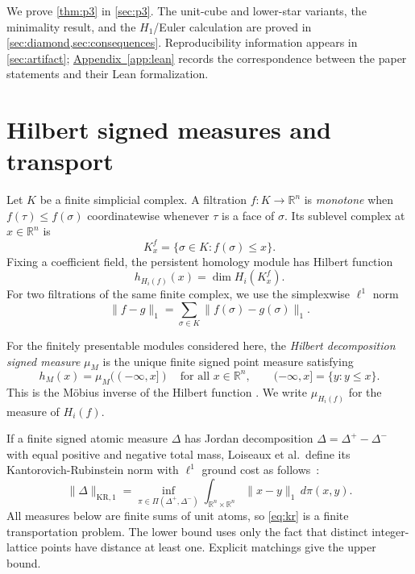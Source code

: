 \documentclass[11pt]{article}
\theoremstyle{definition}
\newcommand{\R}{\mathbb{R}}
\newcommand{\1}{\mathbf{1}}
\newcommand{\KR}{\mathrm{KR}}
\begin{document}
We prove \cref{thm:p3} in \cref{sec:p3}.  The unit-cube and lower-star
variants, the minimality result, and the $H_1$/Euler calculation are proved in
\cref{sec:diamond,sec:consequences}.  Reproducibility information appears in
\cref{sec:artifact};
\hyperref[app:lean]{Appendix~\ref*{app:lean}} records the correspondence
between the paper statements and their Lean formalization.

\section{Hilbert signed measures and transport}\label{sec:background}

Let $K$ be a finite simplicial complex.  A filtration
$f:K\to\R^n$ is \emph{monotone} when
$f(\tau)\leq f(\sigma)$ coordinatewise whenever $\tau$ is a face of
$\sigma$.  Its sublevel complex at $x\in\R^n$ is
\[
  K^f_x=\{\sigma\in K:f(\sigma)\leq x\}.
\]
Fixing a coefficient field, the persistent homology module has Hilbert
function
\[
  h_{H_i(f)}(x)=\dim H_i(K^f_x).
\]
For two filtrations of the same finite complex, we use the simplexwise
$\ell^1$ norm
\[
  \lVert f-g\rVert_1
  =\sum_{\sigma\in K}\lVert f(\sigma)-g(\sigma)\rVert_1.
\]

For the finitely presentable modules considered here, the
\emph{Hilbert decomposition signed measure} $\mu_M$ is the unique finite
signed point measure satisfying
\begin{equation}\label{eq:hilbert-decomp}
  h_M(x)=\mu_M((-\infty,x])
  \quad\text{for all }x\in\R^n,
  \qquad
  (-\infty,x]=\{y:y\leq x\}.
\end{equation}
This is the Möbius inverse of the Hilbert function
\cite[Definition~4 and Appendix~A.4]{LoiseauxEtAl2023}.  We write
$\mu_{H_i(f)}$ for the measure of $H_i(f)$.

If a finite signed atomic measure $\Delta$ has Jordan decomposition
$\Delta=\Delta^+-\Delta^-$ with equal positive and negative total mass,
Loiseaux et al.\ define its Kantorovich-Rubinstein norm with $\ell^1$ ground
cost as follows~\cite[Definition~3]{LoiseauxEtAl2023}:
\begin{equation}\label{eq:kr}
  \lVert\Delta\rVert_{\KR,1}
  =\inf_{\pi\in\Pi(\Delta^+,\Delta^-)}
      \int_{\R^n\times\R^n}\lVert x-y\rVert_1\,d\pi(x,y).
\end{equation}
All measures below are finite sums of unit atoms, so \eqref{eq:kr} is a
finite transportation problem.  The lower bound uses only the fact that
distinct integer-lattice points have distance at least one.  Explicit
matchings give the upper bound.
\end{document}
